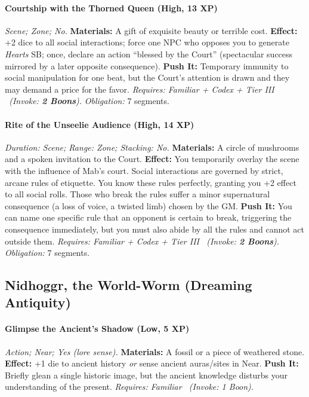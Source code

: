 \paragraph{Courtship with the Thorned Queen (High, 13 XP)} \emph{Scene; Zone; No.}
\textbf{Materials:} A gift of exquisite beauty or terrible cost.
\textbf{Effect:} +2 dice to all social interactions; force one NPC who opposes you to generate \emph{Hearts} SB; once, declare an action ``blessed by the Court'' (spectacular success mirrored by a later opposite consequence).
\textbf{Push It:} Temporary immunity to social manipulation for one beat, but the Court's attention is drawn and they may demand a price for the favor.
\emph{Requires: Familiar + Codex + Tier III \ (\textit{Invoke:} \textbf{2 Boons}).}
\emph{Obligation:} 7 segments.

\paragraph{Rite of the Unseelie Audience (High, 14 XP)} \emph{Duration: Scene; Range: Zone; Stacking: No.}
\textbf{Materials:} A circle of mushrooms and a spoken invitation to the Court.
\textbf{Effect:} You temporarily overlay the scene with the influence of Mab's court. Social interactions are governed by strict, arcane rules of etiquette. You know these rules perfectly, granting you +2 effect to all social rolls. Those who break the rules suffer a minor supernatural consequence (a loss of voice, a twisted limb) chosen by the GM.
\textbf{Push It:} You can name one specific rule that an opponent is certain to break, triggering the consequence immediately, but you must also abide by all the rules and cannot act outside them.
\emph{Requires: Familiar + Codex + Tier III \ (\textit{Invoke:} \textbf{2 Boons}).}
\emph{Obligation:} 7 segments.

\subsection{Nidhoggr, the World-Worm (Dreaming Antiquity)}
\paragraph{Glimpse the Ancient's Shadow (Low, 5 XP)} \emph{Action; Near; Yes (lore sense).}
\textbf{Materials:} A fossil or a piece of weathered stone.
\textbf{Effect:} +1 die to ancient history \emph{or} sense ancient auras/sites in Near.
\textbf{Push It:} Briefly glean a single historic image, but the ancient knowledge disturbs your understanding of the present.
\emph{Requires: Familiar \ (\textit{Invoke:} 1 Boon).}
